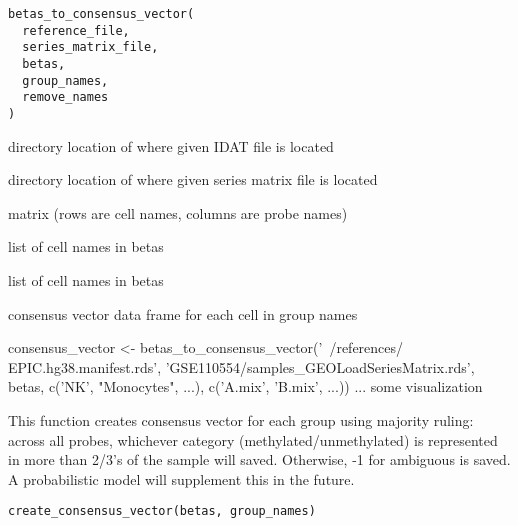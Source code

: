 \documentclass[a4paper]{book}
\begin{document}
%
\begin{Usage}
\begin{verbatim}
betas_to_consensus_vector(
  reference_file,
  series_matrix_file,
  betas,
  group_names,
  remove_names
)
\end{verbatim}
\end{Usage}
%
\begin{Arguments}
\begin{ldescription}
\item[\code{reference\_file}] directory location of where given IDAT file is located

\item[\code{series\_matrix\_file}] directory location of where given series matrix 
file is located

\item[\code{betas}] matrix (rows are cell names, columns are probe names)

\item[\code{group\_names}] list of cell names in betas

\item[\code{remove\_names}] list of cell names in betas
\end{ldescription}
\end{Arguments}
%
\begin{Value}
consensus vector data frame for each cell in group names
\end{Value}
%
\begin{Examples}
\begin{ExampleCode}
consensus_vector <- betas_to_consensus_vector('~/references/
EPIC.hg38.manifest.rds', 'GSE110554/samples_GEOLoadSeriesMatrix.rds', 
betas, c('NK', "Monocytes", ...), c('A.mix', 'B.mix', ...))
... some visualization 
\end{ExampleCode}
\end{Examples}
%
\begin{Description}\relax
This function creates consensus vector for each group using majority ruling:
across all probes, whichever category (methylated/unmethylated) is 
represented in more than 2/3's of the sample will saved. Otherwise, -1 for 
ambiguous is saved. A probabilistic model will supplement this in the future.
\end{Description}
%
\begin{Usage}
\begin{verbatim}
create_consensus_vector(betas, group_names)
\end{verbatim}
\end{Usage}
\end{document}
